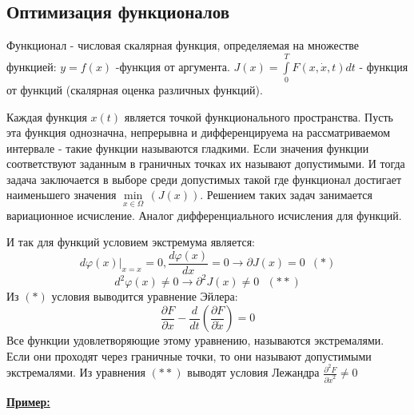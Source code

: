 \documentclass[preprint,russian,a5paper,10pt,twoside]{ncc}
\newcommand{\ExampleMy}{\textbf{\underline{Пример:}}}
\begin{document}
\subsection{Оптимизация функционалов}
\par Функционал - числовая скалярная функция, определяемая на множестве функцией: $y=f\left( x \right)$  -функция от аргумента. $J\left( x \right)=\int\limits_{0}^{T}{F\left( x,\dot{x},t \right)}dt$ - функция от функций  (скалярная оценка различных функций).
\par Каждая функция $x\left( t \right)$ является точкой функционального пространства. Пусть эта функция однозначна, непрерывна и дифференцируема на рассматриваемом интервале - такие функции называются гладкими. Если значения функции соответствуют заданным в граничных точках их называют допустимыми. И тогда задача заключается в выборе среди допустимых такой где функционал достигает наименьшего значения $\underset{x\in \Omega }{\mathop{\min }}\,\left( J\left( x \right) \right)$.
Решением таких задач занимается вариационное исчисление. Аналог дифференциального исчисления для функций. 
\par И так для функций условием экстремума является:
\[{{\left. d\varphi \left( x \right) \right|}_{x={{x}_{{}}}}}=0,\frac{d\varphi \left( x \right)}{dx}=0\to \partial J\left( x \right)=0\,\,\,\left( * \right)\] 
\[{{d}^{2}}\varphi \left( x \right)\ne 0\to {{\partial }^{2}}J\left( x \right)\ne 0\,\,\,\,\left( ** \right)\]
Из $\left( * \right)$  условия выводится уравнение Эйлера: \[\frac{\partial F}{\partial x}-\frac{d}{dt}\left( \frac{\partial F}{\partial \dot{x}} \right)=0\]
Все функции удовлетворяющие этому уравнению, называются экстремалями. Если они проходят через граничные точки,  
то они называют допустимыми экстремалями. Из уравнения $\left( ** \right)$ выводят условия Лежандра $\frac{{{\partial }^{2}}F}{\partial {{{\dot{x}}}^{2}}}\ne 0$ 
\vspace{\baselineskip}
\par\ExampleMy~ 
\end{document}
